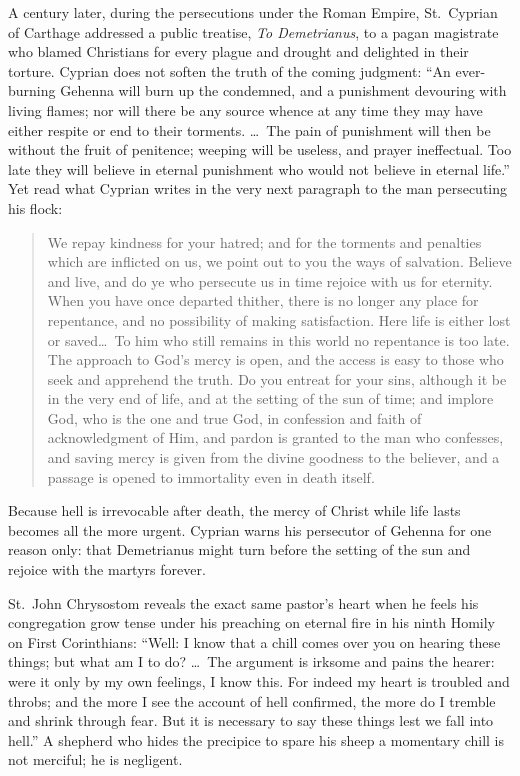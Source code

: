 A century later, during the persecutions under the Roman Empire, St.\ Cyprian of Carthage addressed a public treatise, \textit{To Demetrianus}, to a pagan magistrate who blamed Christians for every plague and drought and delighted in their torture. Cyprian does not soften the truth of the coming judgment: ``An ever-burning Gehenna will burn up the condemned, and a punishment devouring with living flames; nor will there be any source whence at any time they may have either respite or end to their torments. \dots\ The pain of punishment will then be without the fruit of penitence; weeping will be useless, and prayer ineffectual. Too late they will believe in eternal punishment who would not believe in eternal life.'' Yet read what Cyprian writes in the very next paragraph to the man persecuting his flock:

\begin{quote}
We repay kindness for your hatred; and for the torments and penalties which are inflicted on us, we point out to you the ways of salvation. Believe and live, and do ye who persecute us in time rejoice with us for eternity. When you have once departed thither, there is no longer any place for repentance, and no possibility of making satisfaction. Here life is either lost or saved\dots\ To him who still remains in this world no repentance is too late. The approach to God's mercy is open, and the access is easy to those who seek and apprehend the truth. Do you entreat for your sins, although it be in the very end of life, and at the setting of the sun of time; and implore God, who is the one and true God, in confession and faith of acknowledgment of Him, and pardon is granted to the man who confesses, and saving mercy is given from the divine goodness to the believer, and a passage is opened to immortality even in death itself.
\end{quote}

Because hell is irrevocable after death, the mercy of Christ while life lasts becomes all the more urgent. Cyprian warns his persecutor of Gehenna for one reason only: that Demetrianus might turn before the setting of the sun and rejoice with the martyrs forever.

St.\ John Chrysostom reveals the exact same pastor's heart when he feels his congregation grow tense under his preaching on eternal fire in his ninth Homily on First Corinthians: ``Well: I know that a chill comes over you on hearing these things; but what am I to do? \dots\ The argument is irksome and pains the hearer: were it only by my own feelings, I know this. For indeed my heart is troubled and throbs; and the more I see the account of hell confirmed, the more do I tremble and shrink through fear. But it is necessary to say these things lest we fall into hell.'' A shepherd who hides the precipice to spare his sheep a momentary chill is not merciful; he is negligent.

